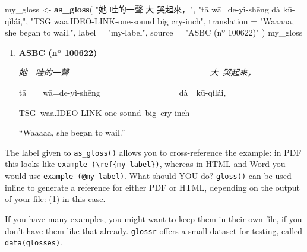 \documentclass[
]{article}
\newenvironment{Shaded}{\begin{snugshade}}{\end{snugshade}}
\newcommand{\AttributeTok}[1]{\textcolor[rgb]{0.13,0.29,0.53}{#1}}
\newcommand{\FunctionTok}[1]{\textcolor[rgb]{0.13,0.29,0.53}{\textbf{#1}}}
\newcommand{\NormalTok}[1]{#1}
\newcommand{\OtherTok}[1]{\textcolor[rgb]{0.56,0.35,0.01}{#1}}
\newcommand{\StringTok}[1]{\textcolor[rgb]{0.31,0.60,0.02}{#1}}
\begin{document}
\begin{Shaded}
\begin{Highlighting}[]
\NormalTok{my\_gloss }\OtherTok{\textless{}{-}} \FunctionTok{as\_gloss}\NormalTok{(}
  \StringTok{"她 哇的一聲 大 哭起來，"}\NormalTok{,}
  \StringTok{"tā wā=de{-}yì{-}shēng dà kū{-}qǐlái,"}\NormalTok{,}
  \StringTok{"TSG waa.IDEO{-}LINK{-}one{-}sound big cry{-}inch"}\NormalTok{,}
  \AttributeTok{translation =} \StringTok{"Waaaaa, she began to wail."}\NormalTok{,}
  \AttributeTok{label =} \StringTok{"my{-}label"}\NormalTok{,}
  \AttributeTok{source =} \StringTok{"ASBC (nº 100622)"}
\NormalTok{)}
\NormalTok{my\_gloss}
\end{Highlighting}
\end{Shaded}

\begin{enumerate}
\def\labelenumi{(\arabic{enumi})}
\item
  \textbf{ASBC (nº 100622)}

  \emph{她}~~\emph{哇的一聲}~~~~~~~~~~~~~~~~~~~~~~~~~~~~~~~~~~\emph{大}~\emph{哭起來，}~

  tā~~~~wā=de-yì-shēng~~~~~~~~~~~~~~~~~~~dà~~kū-qǐlái,~

  TSG~waa.IDEO-LINK-one-sound~big~cry-inch~

  ``Waaaaa, she began to wail.''
\end{enumerate}

The label given to \texttt{as\_gloss()} allows you to cross-reference the example: in PDF this looks like \texttt{example\ (\textbackslash{}ref\{my-label\})}, whereas in HTML and Word you would use \texttt{example\ (@my-label)}. What should YOU do? \texttt{gloss()} can be used inline to generate a reference for either PDF or HTML, depending on the output of your file: (1) in this case.

If you have many examples, you might want to keep them in their own file, if you don't have them like that already. \texttt{glossr} offers a small dataset for testing, called \texttt{data(glosses)}.
\end{document}
